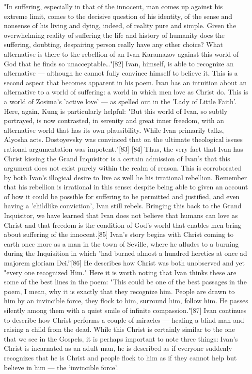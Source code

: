 "In suffering, especially in that of the innocent, man comes up against his extreme limit, comes to the decisive question of his identity, of the sense and nonsense of his living and dying, indeed, of reality pure and simple. Given the overwhelming reality of suffering the life and history of humanity does the suffering, doubting, despairing person really have any other choice? What alternative is there to the rebellion of an Ivan Karamazov against this world of God that he finds so unacceptable…"[82] Ivan, himself, is able to recognize an alternative — although he cannot fully convince himself to believe it. This is a second aspect that becomes apparent in his poem. Ivan has an intuition about an alternative to a world of suffering: a world in which men love as Christ do. This is a world of Zosima's 'active love' — as spelled out in the 'Lady of Little Faith'.
Here, again, Kung is particularly helpful: "But this world of Ivan, so subtly portrayed, is now contrasted, in serenity and great inner freedom, with an alternative world that has its own plausibility. While Ivan primarily talks, Alyosha acts. Dostoyevsky was convinced that on the ultimate theological issues rational argumentation was impotent."[83] [84] Thus, the very fact that Ivan has Christ kissing the Grand Inquisitor is a certain admission of Ivan's that this argument does not exist purely within the realm of reason. This is corroborated by both Ivan's illogical desire to live as well he his irrational rebellion. Remember that his rebellion is irrational in this sense: despite being able to given an account of how it could be possible for suffering to be permitted and justified, and even having a 'childlike conviction', Ivan still rebels.
Bringing this back to the Grand Inquisitor, we have learned that Ivan does not believe that humans can love as Christ and that freedom is the condition of God's world that enables men bring about suffering of the innocent.[85] Ivan's story begins with Christ coming to earth once more as a man in the town of Seville, where he alludes to a burning during the Inquisition in which "had burned almost a hundred heretics at once ad majorem gloriam Dei.”[86] He describes how Christ was both unobserved and yet "every one recognized Him." Here it is worth noting that Ivan thinks these are some of the best lines in the poem: "This could be one of the best passages in the poem, I mean, why it is exactly that they recognize him. People are drawn to him by an invincible force, they flock to him, surround him, follow him. He passes silently among them with a quiet smile of infinite compassion."[87] Ivan continues to describe how Christ performs a couple of miracles — healing a blind man and raising a child from the dead. While this Christ is certainly similar to the one that we see in the Gospels, it is perhaps important to note three things: Ivan's Christ is incarnated as an adult man, he is described as if everyone suddenly recognizes that he is Christ and people flock to him as if they cannot help but believe in him — the ‘invincible force’.
